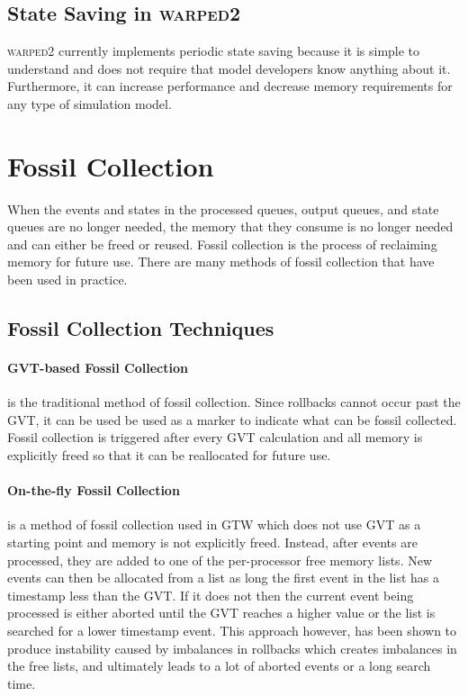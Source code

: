 \documentclass[11pt]{book}
\begin{document}
\subsection{State Saving in \textsc{warped2}}

\textsc{warped2} currently implements periodic state saving because it is simple to understand
and does not require that model developers know anything about it. Furthermore, it can increase
performance and decrease memory requirements for any type of simulation model. 

\section{Fossil Collection}

When the events and states in the processed queues, output queues, and state queues are
no longer needed, the memory that they consume is no longer needed and can either be freed
or reused. Fossil collection is the process of reclaiming memory for future use. There
are many methods of fossil collection that have been used in practice.

\subsection{Fossil Collection Techniques}

\paragraph{GVT-based Fossil Collection} is the traditional method of fossil collection.
Since rollbacks cannot occur past the GVT, it can be used be used as a marker to indicate
what can be fossil collected. Fossil collection is triggered after every GVT calculation
and all memory is explicitly freed so that it can be reallocated for future use.

\paragraph{On-the-fly Fossil Collection} is a method of fossil collection used in GTW
which does not use GVT as a starting point and memory is not explicitly freed. Instead, after
events are processed, they are added to one of the per-processor free memory lists. New events
can then be allocated from a list as long the first event in the list has a timestamp less than
the GVT. If it does not then the current event being processed is either aborted until the GVT
reaches a higher value or the list is searched for a lower timestamp event. This approach however,
has been shown to produce instability caused by imbalances in rollbacks which creates imbalances
in the free lists, and ultimately leads to a lot of aborted events or a long search time.
\end{document}
